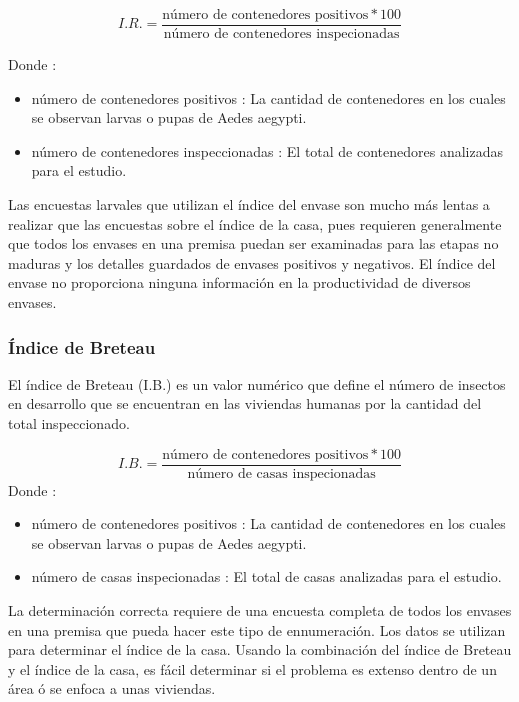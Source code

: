 \begin{equation}
I.R. = \frac{\text{número de contenedores positivos} * 100}{\text{número de contenedores inspecionadas}}
\end{equation}

Donde :
\begin{itemize}
\item número de contenedores positivos : La cantidad de contenedores en los
cuales se observan larvas o pupas de Aedes aegypti.
\item número de contenedores  inspeccionadas : El total de contenedores
analizadas para el estudio.
\end{itemize}

Las encuestas larvales que utilizan el índice del envase son mucho más
lentas a realizar que las encuestas sobre el índice de la casa, pues
requieren generalmente que todos los envases en una premisa puedan ser
examinadas para las etapas no maduras y los detalles guardados de envases
positivos y negativos. El índice del envase no proporciona ninguna información
en la productividad de diversos envases.

\subsubsection{Índice de Breteau}
El índice de Breteau (I.B.) es un valor numérico que define el número de
insectos en desarrollo que se encuentran en las viviendas humanas por
la cantidad del total inspeccionado.

\begin{equation}
I.B. = \frac{\text{número de contenedores positivos} * 100}{\text{número de casas inspecionadas}}
\end{equation}
Donde :
\begin{itemize}
\item número de contenedores positivos : La cantidad de contenedores en los
cuales se observan larvas o pupas de Aedes aegypti.
\item número de casas inspecionadas : El total de casas analizadas para
el estudio.
\end{itemize}

La determinación correcta requiere de una encuesta completa de todos los
envases en una premisa que pueda hacer este tipo de ennumeración. Los
datos se utilizan para determinar el índice de la casa. Usando la
combinación del índice de Breteau y el índice de la casa, es fácil
determinar si el problema es extenso dentro de un área ó se enfoca a
unas viviendas.

